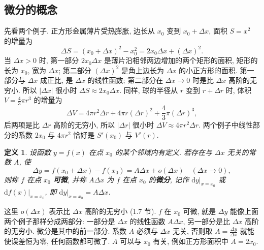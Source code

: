 \documentclass[UTF8,openany]{ctexbook}
\theoremstyle{chinesetextbook}
\newtheorem*{definitionsingle}{定义}
\newcommand{\dd}{\mathrm d}
\begin{document}
\subsection{微分的概念}
先看两个例子. 正方形金属薄片受热膨胀, 边长从 $x_0$ 变到 $x_0+\Delta x$, 面积 $S=x^2$ 的增量为
\[
\Delta S=(x_0+\Delta x)^2-x_0^2=2x_0\Delta x+(\Delta x)^2.
\]
当 $\Delta x>0$ 时, 第一部分 $2x_0\Delta x$ 是薄片沿相邻两边增加的两个矩形的面积, 矩形的长为 $x_0$, 宽为 $\Delta x$; 第二部分 $(\Delta x)^2$ 是角上边长为 $\Delta x$ 的小正方形的面积. 第一部分与 $\Delta x$ 成正比, 是 $\Delta x$ 的线性函数; 第二部分在 $\Delta x\to0$ 时是比 $\Delta x$ 高阶的无穷小. 所以 $|\Delta x|$ 很小时 $\Delta S\approx2x_0\Delta x$. 同样, 球的半径从 $r$ 变到 $r+\Delta r$ 时, 体积 $\displaystyle V=\frac43\pi r^3$ 的增量为
\[
\Delta V=4\pi r^2\Delta r+4\pi r(\Delta r)^2+\frac43\pi(\Delta r)^3,
\]
后两项是比 $\Delta r$ 高阶的无穷小, 所以 $|\Delta r|$ 很小时 $\Delta V\approx4\pi r^2\Delta r$. 两个例子中线性部分的系数 $2x_0$ 与 $4\pi r^2$ 恰好是 $S'(x_0)$ 与 $V'(r)$.
\begin{definitionsingle}
设函数 $y=f(x)$ 在点 $x_0$ 的某个邻域内有定义. 若存在与 $\Delta x$ 无关的常数 $A$, 使
\[
\Delta y=f(x_0+\Delta x)-f(x_0)=A\Delta x+o(\Delta x)\quad(\Delta x\to0),
\]
则称 $f$ 在点 $x_0$ \textbf{可微}, 并称 $A\Delta x$ 为 $f$ 在点 $x_0$ 的\textbf{微分}, 记作 $\dd y\big|_{x=x_0}$ 或 $\dd f(x)\big|_{x=x_0}$, 即 $\dd y\big|_{x=x_0}=A\Delta x$.
\end{definitionsingle}
这里 $o(\Delta x)$ 表示比 $\Delta x$ 高阶的无穷小 (1.7 节). $f$ 在 $x_0$ 可微, 就是 $\Delta y$ 能像上面两个例子那样分成两部分: 一部分是 $\Delta x$ 的线性函数 $A\Delta x$, 另一部分是比 $\Delta x$ 高阶的无穷小. 微分是其中的前一部分. 系数 $A$ 必须与 $\Delta x$ 无关, 否则取 $\displaystyle A=\frac{\Delta y}{\Delta x}$ 就能使误差恒为零, 任何函数都可微了. $A$ 可以与 $x_0$ 有关, 例如正方形面积中 $A=2x_0$.
\end{document}
